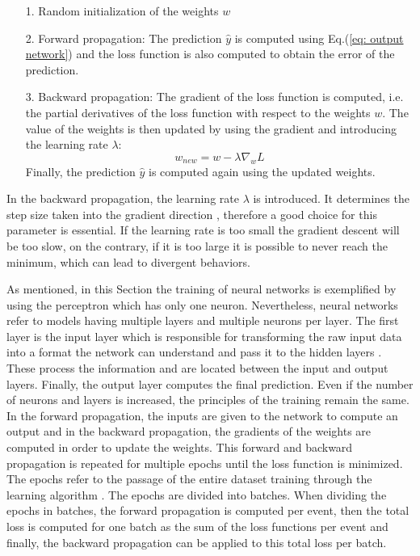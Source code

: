 \begin{itemize}
    \item[1.] Random initialization of the weights $w$
    \item[2.] Forward propagation: The prediction $\hat{y}$ is computed using Eq.(\ref{eq: output network}) and the loss function is also computed to obtain the error of the prediction.
    \item[3.] Backward propagation: The gradient of the loss function is computed, i.e. the partial derivatives of the loss function with respect to the weights $w$. The value of the weights is then updated by using the gradient and introducing the learning rate $\lambda$:
    \begin{equation}
        w_{new}=w-\lambda \nabla_w L
    \end{equation}
    Finally, the prediction $\hat{y}$ is computed again using the updated weights.
\end{itemize}

In the backward propagation, the learning rate $\lambda$ is introduced. It determines the step size taken into the gradient direction \cite{Learning_rate}, therefore a good choice for this parameter is essential. 
If the learning rate is too small the gradient descent will be too slow, on the contrary, if it is too large it is possible to never reach the minimum, which can lead to divergent behaviors.

As mentioned, in this Section the training of neural networks is exemplified by using the perceptron which has only one neuron. Nevertheless, neural networks refer to models having multiple layers and multiple neurons per layer.  The first layer is the input layer which is responsible for transforming the raw input data into a format the network can understand and pass it to the hidden layers \cite{layers}.  These process the information and are located between the input and output layers. Finally, the output layer computes the final prediction. Even if the number of neurons and layers is increased, the principles of the training remain the same. In the forward propagation, the inputs are given to the network to compute an output and in the backward propagation, the gradients of the weights are computed in order to update the weights. This forward and backward propagation is repeated for multiple epochs until the loss function is minimized. The epochs refer to the passage of the entire dataset training through the learning algorithm \cite{epoch_batch}. The epochs are divided into batches. When dividing the epochs in batches, the forward propagation is computed per event, then the total loss is computed for one batch as the sum of the loss functions per event and finally, the backward propagation can be applied to this total loss per batch.

